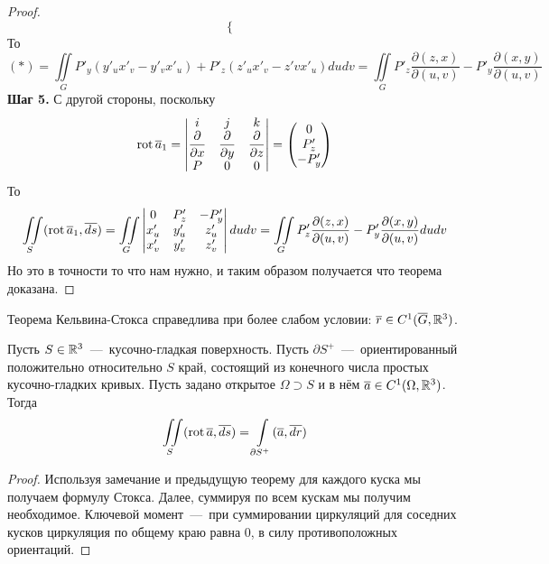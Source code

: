 \begin{proof}
\begin{equation*}
\begin{cases}
        \end{cases}
    \end{equation*}
    То \[(*) = \iint\limits_G P'_y(y'_ux'_v - y'_vx'_u) + P'_z(z'_ux'_v - z'vx'_u)dudv = \iint\limits_G P'_z\dfrac{\partial(z, x)}{\partial(u, v)} - P'_y \dfrac{\partial(x, y)}{\partial(u, v)}\]
    \textbf{Шаг 5.} С другой стороны, поскольку \[\operatorname{rot} \overline{a}_1 = \begin{vmatrix}
        i & j & k \\ \dfrac{\partial}{\partial x} & \dfrac{\partial}{\partial y} & \dfrac{\partial}{\partial z} \\ P & 0 & 0
    \end{vmatrix} = \begin{pmatrix}
        0 \\ P'_z \\ -P'_y
    \end{pmatrix}\]
    То \[\iint\limits_S (\operatorname{rot} \overline{a}_1, \overline{ds}) = \iint\limits_G \begin{vmatrix}
        0 & P'_z & -P'_y \\ x'_u & y'_u & z'_u \\ x'_v & y'_v & z'_v
    \end{vmatrix} dudv = \iint\limits_G P'_z \dfrac{\partial(z, x)}{\partial(u, v)} - P'_y \dfrac{\partial(x, y)}{\partial(u, v)}dudv\]
    Но это в точности то что нам нужно, и таким образом получается что теорема доказана.
\end{proof}
\begin{note}
    Теорема Кельвина-Стокса справедлива при более слабом условии: $\overline{r} \in C^1(\overline{G}, \mathbb{R}^3)$.
\end{note}
\begin{theorem}
    Пусть $S \in \mathbb{R}^3$~---~кусочно-гладкая поверхность. Пусть $\partial S^+$~---~ориентированный положительно относительно $S$ край, состоящий из конечного числа простых кусочно-гладких кривых. Пусть задано открытое $\Omega \supset S$ и в нём $\overline{a} \in C^1(\Omega, \mathbb{R}^3)$. Тогда \[\iint\limits_S (\operatorname{rot} \overline{a}, \overline{ds}) = \int\limits_{\partial S^+} (\overline{a}, \overline{dr})\]
\end{theorem}
\begin{proof}
    Используя замечание и предыдущую теорему для каждого куска мы получаем формулу Стокса. Далее, суммируя по всем кускам мы получим необходимое. Ключевой момент~---~при суммировании циркуляций для соседних кусков циркуляция по общему краю равна 0, в силу противоположных ориентаций.
\end{proof}

